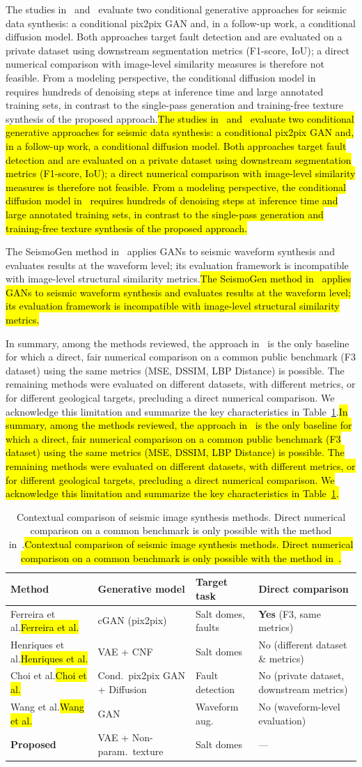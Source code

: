 \documentclass{ieeeaccess}
\DeclareRobustCommand{\DIFaddbegin}{\DIFOaddbegin \let\includegraphics\DIFaddincludegraphics} %
\DeclareRobustCommand{\DIFaddend}{\DIFOaddend \let\includegraphics\DIFOincludegraphics} %
\providecommand{\DIFadd}[1]{{\protect\color{blue}#1}}
\renewcommand{\DIFadd}[1]{\ifmmode#1\else\begingroup\let\protect\relax\hl{#1}\endgroup\fi}
\providecommand{\DIFaddbegin}{}
\providecommand{\DIFaddend}{}
\renewcommand{\DIFaddbegin}{}
\renewcommand{\DIFaddend}{}
\begin{document}
\DIFaddbegin \DIFadd{The studies in~\cite{Choi2021} and~\cite{Choi2025} evaluate two conditional generative approaches for seismic data synthesis: a conditional pix2pix GAN and, in a follow-up work, a conditional diffusion model. Both approaches target fault detection and are evaluated on a private dataset using downstream segmentation metrics (F1-score, IoU); a direct numerical comparison with image-level similarity measures is therefore not feasible. From a modeling perspective, the conditional diffusion model in~\cite{Choi2025} requires hundreds of denoising steps at inference time and large annotated training sets, in contrast to the single-pass generation and training-free texture synthesis of the proposed approach.}\DIFaddend

\DIFaddbegin \DIFadd{The SeismoGen method in~\cite{Wang2021} applies GANs to seismic waveform synthesis and evaluates results at the waveform level; its evaluation framework is incompatible with image-level structural similarity metrics.}\DIFaddend

\DIFaddbegin \DIFadd{In summary, among the methods reviewed, the approach in~\cite{Ferreira2020} is the only baseline for which a direct, fair numerical comparison on a common public benchmark (F3 dataset) using the same metrics (MSE, DSSIM, LBP Distance) is possible. The remaining methods were evaluated on different datasets, with different metrics, or for different geological targets, precluding a direct numerical comparison. We acknowledge this limitation and summarize the key characteristics in Table~\ref{tab:comparison_overview}.}\DIFaddend

\begin{table}[htbp]
    \centering
    \caption{\DIFadd{Contextual comparison of seismic image synthesis methods. Direct numerical comparison on a common benchmark is only possible with the method in~\cite{Ferreira2020}.}}
    \label{tab:comparison_overview}
    \footnotesize
    \begin{tabular}{p{2.0cm}p{1.5cm}p{1.6cm}p{1.5cm}}
        \toprule
        \textbf{Method} & \textbf{Generative model} & \textbf{Target task} & \textbf{Direct comparison} \\
        \midrule
        \DIFadd{Ferreira et al.}& cGAN (pix2pix) & Salt domes, faults & \textbf{Yes} (F3, same metrics) \\
        \DIFadd{Henriques et al.}& VAE + CNF & Salt domes & No (different dataset \& metrics) \\
        \DIFadd{Choi et al.}& Cond.\ pix2pix GAN + Diffusion & Fault detection & No (private dataset, downstream metrics) \\
        \DIFadd{Wang et al.}& GAN & Waveform aug. & No (waveform-level evaluation) \\
        \midrule
        \textbf{Proposed} & VAE + Non-param.\ texture & Salt domes & --- \\
        \bottomrule
    \end{tabular}
\end{table}
\end{document}
